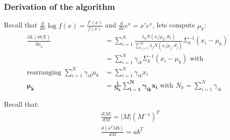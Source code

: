 \documentclass[11pt]{article}
\begin{document}
\subsubsection{Derivation of the algorithm}
Recall that $\frac{d}{dx} \log f(x) = \frac{f'(x)}{f(x)}$ and $\frac{d}{dx} e ^x=x' e^x$, lets compute $\mu _k$:
\begin{align}
\frac{\partial L(\Theta | X)}{\partial\mu _k} &=  \sum_{i=1}^N \frac{\lambda_k N(x_i| \mu _k, \theta _k)}{\sum _{j=1}^K \lambda _j N(x_i| \mu _j, \theta _j)} \Sigma _k^{-1} (x_i-\mu _k) \nonumber\\
&=  \sum_{i=1}^N \gamma _{ik} \Sigma _k^{-1} (x_i-\mu _k) \text{~with ~} \nonumber\\
\text{rearranging~} \sum_{i=1}^N \gamma _{ik} \mu _ k &= \sum_{i=1}^N \gamma _{ik} x_i \nonumber\\
\bm{\mu _ k} &= \bm{\frac{1}{N_k} \sum_{i=1}^N \gamma _{ik} x_i} \text{~with~} N_k = \sum _{i=1}^N \gamma _{ik}
\end{align}

Recall that:
\begin{align*}
& \frac{d|M|}{dM} = |M|(M^{-1})^T \\
& \frac{d(a^TMb)}{dM} = ab^T
\end{align*}
\end{document}
